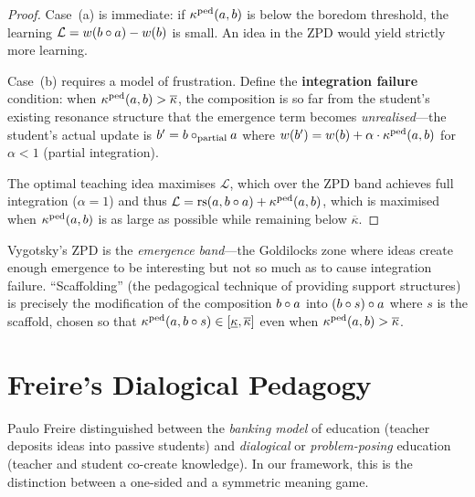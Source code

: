 \begin{proof}
Case~(a) is immediate: if $\kappa^{\mathrm{ped}}(a,b)$ is below
the boredom threshold, the learning $\mathcal{L} = w(b \circ a) - w(b)$
is small.  An idea in the ZPD would yield strictly more learning.

Case~(b) requires a model of frustration.  Define the
\textbf{integration failure} condition: when $\kappa^{\mathrm{ped}}(a,b)
> \overline{\kappa}$, the composition is so far from the student's
existing resonance structure that the emergence term becomes
\emph{unrealised}---the student's actual update is
$b' = b \circ_{\mathrm{partial}} a$ where
$w(b') = w(b) + \alpha \cdot \kappa^{\mathrm{ped}}(a,b)$ for
$\alpha < 1$ (partial integration).

The optimal teaching idea maximises $\mathcal{L}$, which over the
ZPD band achieves full integration ($\alpha = 1$) and thus
$\mathcal{L} = \mathrm{rs}(a, b \circ a) + \kappa^{\mathrm{ped}}(a,b)$,
which is maximised when $\kappa^{\mathrm{ped}}(a,b)$ is as large
as possible while remaining below $\overline{\kappa}$.
\end{proof}

\begin{interpretation}
Vygotsky's ZPD is the \emph{emergence band}---the Goldilocks zone
where ideas create enough emergence to be interesting but not so
much as to cause integration failure.  ``Scaffolding'' (the
pedagogical technique of providing support structures) is precisely
the modification of the composition $b \circ a$ into
$(b \circ s) \circ a$ where $s$ is the scaffold, chosen so
that $\kappa^{\mathrm{ped}}(a, b \circ s) \in [\underline{\kappa},
\overline{\kappa}]$ even when $\kappa^{\mathrm{ped}}(a, b) > \overline{\kappa}$.
\end{interpretation}

\section{Freire's Dialogical Pedagogy}
\label{sec:freire}

Paulo Freire distinguished between the \emph{banking model}
of education (teacher deposits ideas into passive students)
and \emph{dialogical} or \emph{problem-posing} education
(teacher and student co-create knowledge).  In our framework,
this is the distinction between a one-sided and a symmetric
meaning game.

